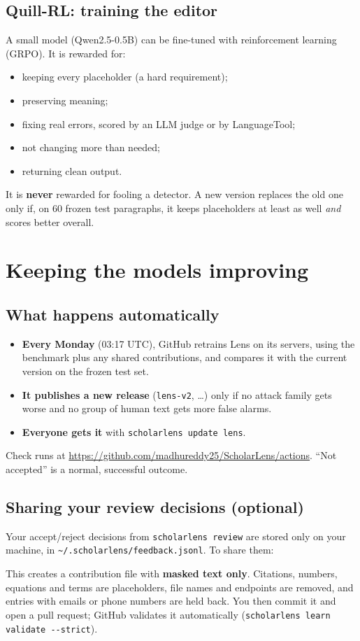 \documentclass[11pt]{article}
\newcommand{\cm}[1]{\texttt{#1}}
\begin{document}
\subsection{Quill-RL: training the editor}
A small model (Qwen2.5-0.5B) can be fine-tuned with reinforcement learning (GRPO). It is rewarded for:
\begin{itemize}
  \item keeping every placeholder (a hard requirement);
  \item preserving meaning;
  \item fixing real errors, scored by an LLM judge or by LanguageTool;
  \item not changing more than needed;
  \item returning clean output.
\end{itemize}
It is \textbf{never} rewarded for fooling a detector. A new version replaces the old one only if, on 60 frozen test paragraphs, it keeps placeholders at least as well \emph{and} scores better overall.

\section{Keeping the models improving}

\subsection*{What happens automatically}
\begin{itemize}
  \item \textbf{Every Monday} (03:17 UTC), GitHub retrains Lens on its servers, using the benchmark plus any shared contributions, and compares it with the current version on the frozen test set.
  \item \textbf{It publishes a new release} (\cm{lens-v2}, \ldots) only if no attack family gets worse and no group of human text gets more false alarms.
  \item \textbf{Everyone gets it} with \cm{scholarlens update lens}.
\end{itemize}
Check runs at \url{https://github.com/madhureddy25/ScholarLens/actions}. ``Not accepted'' is a normal, successful outcome.

\subsection*{Sharing your review decisions (optional)}
Your accept/reject decisions from \cm{scholarlens review} are stored only on your machine, in \cm{\textasciitilde/.scholarlens/feedback.jsonl}. To share them:
This creates a contribution file with \textbf{masked text only}. Citations, numbers, equations and terms are placeholders, file names and endpoints are removed, and entries with emails or phone numbers are held back. You then commit it and open a pull request; GitHub validates it automatically (\cm{scholarlens learn validate -{}-strict}).
\end{document}
